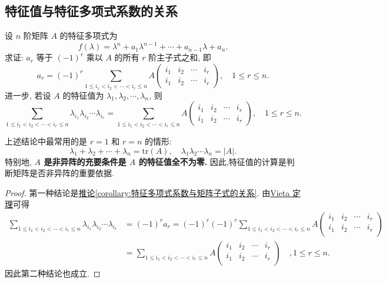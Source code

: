 \documentclass[../../main.tex]{subfiles}%
\begin{document}
\subsection{特征值与特征多项式系数的关系}

\begin{proposition}[特征值与特征多项式系数的关系]\label{proposition:特征值与特征多项式系数的关系}
设 $n$ 阶矩阵 $A$ 的特征多项式为
\[
f(\lambda) = \lambda^n + a_1 \lambda^{n-1} + \cdots + a_{n-1} \lambda + a_n.
\]
求证: $a_r$ 等于 $(-1)^r$ 乘以 $A$ 的所有 $r$ 阶主子式之和, 即
\[
a_r = (-1)^r \sum_{1 \leqslant  i_1 < i_2 < \cdots < i_r \leqslant  n}  A
\begin{pmatrix}
i_1 & i_2 & \cdots & i_r \\
i_1 & i_2 & \cdots & i_r
\end{pmatrix}, \quad 1 \leqslant  r \leqslant  n.
\]
进一步, 若设 $A$ 的特征值为 $\lambda_1, \lambda_2, \cdots, \lambda_n$, 则
\[
\sum_{1 \leqslant  i_1 < i_2 < \cdots < i_r \leqslant  n} \lambda_{i_1} \lambda_{i_2} \cdots \lambda_{i_r} = \sum_{1 \leqslant  i_1 < i_2 < \cdots < i_r \leqslant  n} A
\begin{pmatrix}
i_1 & i_2 & \cdots & i_r \\
i_1 & i_2 & \cdots & i_r
\end{pmatrix}, \quad 1 \leqslant  r \leqslant  n.
\]
\end{proposition}
\begin{remark}
上述结论中最常用的是 $r = 1$ 和 $r = n$ 的情形:
\[
\lambda_1 + \lambda_2 + \cdots + \lambda_n = \mathrm{tr}(A), \quad \lambda_1 \lambda_2 \cdots \lambda_n = |A|.
\]
特别地,\textbf{ $A$ 是非异阵的充要条件是 $A$ 的特征值全不为零.} 因此,特征值的计算是判断矩阵是否非异阵的重要依据.
\end{remark}
\begin{proof}
第一种结论是\hyperref[corollary:特征多项式系数与矩阵子式的关系]{推论\ref{corollary:特征多项式系数与矩阵子式的关系}}. 
由\hyperref[theorem:Vieta定理]{Vieta 定理}可得
\begin{align*}
\sum_{1\leqslant i_1<i_2<\cdots <i_r\leqslant n}{\lambda _{i_1}\lambda _{i_2}}\cdots \lambda _{i_r}&=\left( -1 \right) ^ra_r=\left( -1 \right) ^r\left( -1 \right) ^r\sum_{1\leqslant i_1<i_2<\cdots <i_r\leqslant n}{A\left( \begin{matrix}
i_1&		i_2&		\cdots&		i_r\\
i_1&		i_2&		\cdots&		i_r\\
\end{matrix} \right)}
\\
&=\sum_{1\leqslant i_1<i_2<\cdots <i_r\leqslant n}{A\left( \begin{matrix}
i_1&		i_2&		\cdots&		i_r\\
i_1&		i_2&		\cdots&		i_r\\
\end{matrix} \right)}\quad ,1\leqslant r\leqslant n.
\end{align*}
因此第二种结论也成立.
\end{proof}
\end{document}
